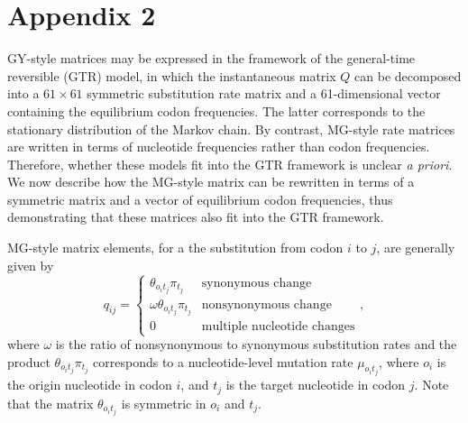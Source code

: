 \documentclass[11pt]{article}
\begin{document}
\section*{Appendix 2}
GY-style matrices may be expressed in the framework of the general-time reversible (GTR) model, in which the instantaneous matrix $Q$ can be decomposed into a $61 \times 61$ symmetric substitution rate matrix and a 61-dimensional vector containing the equilibrium codon frequencies. The latter corresponds to the stationary distribution of the Markov chain. By contrast, MG-style rate matrices are written in terms of nucleotide frequencies rather than codon frequencies. Therefore, whether these models fit into the GTR framework is unclear \emph{a priori}. We now describe how the MG-style matrix can be rewritten in terms of a symmetric matrix and a vector of equilibrium codon frequencies, thus demonstrating that these matrices also fit into the GTR framework.
 
MG-style matrix elements, for a the substitution from codon $i$ to $j$, are generally given by 
\begin{equation}\label{eq:MGstyle}
q_{ij} = \left\{ 
\begin{array}{rl}
\theta_{o_it_j}\pi_{t_j}          &\text{synonymous change} \\
\omega \theta_{o_it_j}\pi_{t_j}   &\text{nonsynonymous change} \\
0                             &\text{multiple nucleotide changes}       
\end{array} \right. ,
\end{equation} where $\omega$ is the ratio of nonsynonymous to synonymous substitution rates and the product $\theta_{o_it_j}\pi_{t_j}$ corresponds to a nucleotide-level mutation rate $\mu_{o_it_j}$, where $o_i$ is the origin nucleotide in codon $i$, and $t_j$ is the target nucleotide in codon $j$. Note that the matrix $\theta_{o_it_j}$ is symmetric in $o_i$ and $t_j$.
\end{document}
